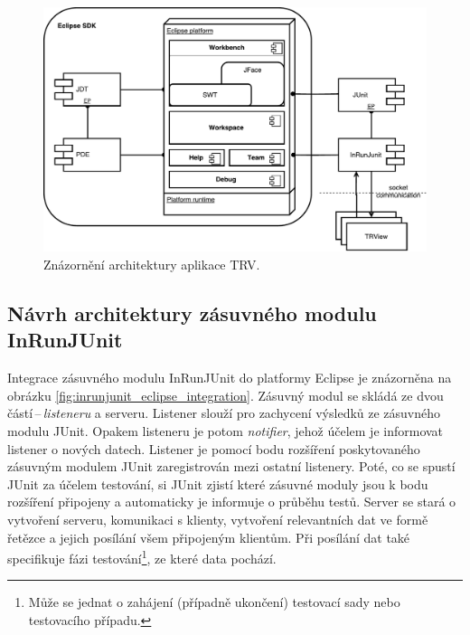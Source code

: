   \begin{figure}
    \includegraphics[width=\textwidth, center]{obrazky-figures/TRV_architecture.pdf}
    \caption{Znázornění architektury aplikace TRV.}
    \label{fig:TRV_architecture}
  \end{figure}

    \subsection{Návrh architektury zásuvného modulu InRunJUnit}
    Integrace zásuvného modulu InRunJUnit do platformy Eclipse je znázorněna na obrázku \ref{fig:inrunjunit_eclipse_integration}. Zásuvný modul se skládá ze dvou částí\,--\,\emph{listeneru} a serveru. Listener slouží pro zachycení výsledků ze zásuvného modulu JUnit. Opakem listeneru je potom \emph{notifier}, jehož účelem je informovat listener o nových datech. Listener je pomocí bodu rozšíření poskytovaného zásuvným modulem JUnit zaregistrován mezi ostatní listenery. Poté, co se spustí JUnit za účelem testování, si JUnit zjistí které zásuvné moduly jsou k bodu rozšíření připojeny a automaticky je informuje o průběhu testů. Server se stará o vytvoření serveru, komunikaci s klienty, vytvoření relevantních dat ve formě řetězce a jejich posílání všem připojeným klientům. Při posílání dat také specifikuje fázi testování\footnote{Může se jednat o zahájení (případně ukončení) testovací sady nebo testovacího případu.}, ze které data pochází.

